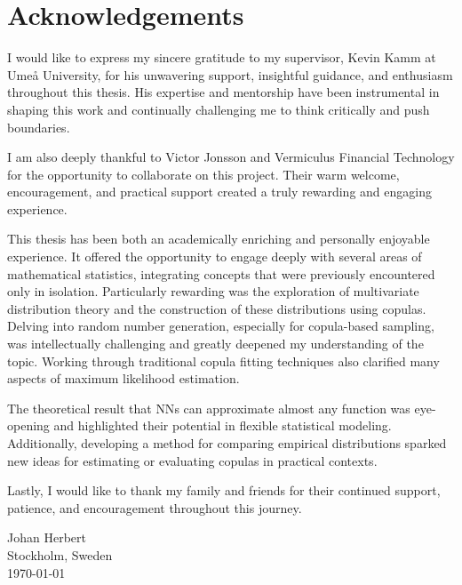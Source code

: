 \documentclass[%
a4paper,							
11pt,								
bibliography=totoc,						
abstracton=true					
]
{scrartcl}
\theoremstyle{plain}
\theoremstyle{definition}
\theoremstyle{remark}
\newcommand{\1}{\mathbbm{1}}
\begin{document}
\section*{Acknowledgements}
I would like to express my sincere gratitude to my supervisor, Kevin Kamm at Umeå University, for his unwavering support, insightful guidance, and enthusiasm throughout this thesis. His expertise and mentorship have been instrumental in shaping this work and continually challenging me to think critically and push boundaries.

I am also deeply thankful to Victor Jonsson and Vermiculus Financial Technology for the opportunity to collaborate on this project. Their warm welcome, encouragement, and practical support created a truly rewarding and engaging experience.

This thesis has been both an academically enriching and personally enjoyable experience. It offered the opportunity to engage deeply with several areas of mathematical statistics, integrating concepts that were previously encountered only in isolation. Particularly rewarding was the exploration of multivariate distribution theory and the construction of these distributions using copulas. Delving into random number generation, especially for copula-based sampling, was intellectually challenging and greatly deepened my understanding of the topic. Working through traditional copula fitting techniques also clarified many aspects of maximum likelihood estimation.

The theoretical result that \gls{NN}s can approximate almost any function was eye-opening and highlighted their potential in flexible statistical modeling. Additionally, developing a method for comparing empirical distributions sparked new ideas for estimating or evaluating copulas in practical contexts.

Lastly, I would like to thank my family and friends for their continued support, patience, and encouragement throughout this journey.

Johan Herbert\\
Stockholm, Sweden\\
\today 

\newpage
\clearpage
\newpage
{\hypersetup{linkcolor=black}
\tableofcontents
}
\newpage
{}
\pagestyle{scrheadings}
\end{document}
